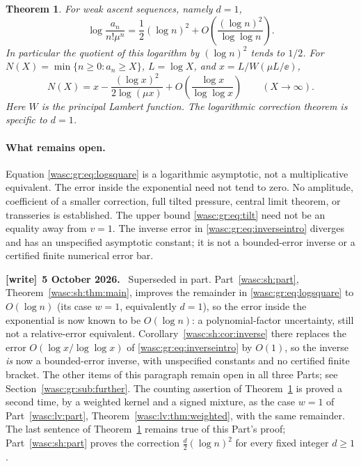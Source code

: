 \documentclass[11pt,a4paper]{article}
\newtheorem{theorem}{Theorem}[section]
\theoremstyle{remark}\newtheorem{remark}[theorem]{Remark}
\numberwithin{equation}{section}
\newenvironment{writenote}[1][]{\par\smallskip\begingroup\small
 \noindent\textbf{[write]}\if\relax\detokenize{#1}\relax\else~\textbf{#1.}\fi\ }%
 {\par\endgroup\smallskip}
\begin{document}
\begin{theorem}\label{wasc:gr:thm:logsquare}
For weak ascent sequences, namely $d=1$,
\begin{equation}\label{wasc:gr:eq:logsquare}
\log\frac{a_n}{n!\mu^n}=\frac12(\log n)^2+
O\!\left(\frac{(\log n)^2}{\log\log n}\right).
\end{equation}
In particular the quotient of this logarithm by $(\log n)^2$ tends to $1/2$.
For $N(X)=\min\{n\ge0:a_n\ge X\}$, $L=\log X$, and
$x=L/W(\mu L/\ee)$,
\begin{equation}\label{wasc:gr:eq:inverseintro}
N(X)=x-\frac{(\log x)^2}{2\log(\mu x)}
+O\!\left(\frac{\log x}{\log\log x}\right)\qquad(X\to\infty).
\end{equation}
Here $W$ is the principal Lambert function. The logarithmic correction theorem is specific to $d=1$.
\end{theorem}

\paragraph{What remains open.}
Equation \eqref{wasc:gr:eq:logsquare} is a logarithmic asymptotic, not a multiplicative equivalent. The error inside the exponential need not tend to zero. No amplitude, coefficient of a smaller correction, full tilted pressure, central limit theorem, or transseries is established. The upper bound \eqref{wasc:gr:eq:tilt} need not be an equality away from $v=1$. The inverse error in \eqref{wasc:gr:eq:inverseintro} diverges and has an unspecified asymptotic constant; it is not a bounded-error inverse or a certified finite numerical error bar.
\begin{writenote}[5 October 2026]
Superseded in part. Part~\ref{wasc:sh:part}, Theorem~\ref{wasc:sh:thm:main}, improves the remainder in \eqref{wasc:gr:eq:logsquare} to $O(\log n)$ (its case $w=1$, equivalently $d=1$), so the error inside the exponential is now known to be $O(\log n)$: a polynomial-factor uncertainty, still not a relative-error equivalent. Corollary~\ref{wasc:sh:cor:inverse} there replaces the error $O(\log x/\log\log x)$ of \eqref{wasc:gr:eq:inverseintro} by $O(1)$, so the inverse \emph{is} now a bounded-error inverse, with unspecified constants and no certified finite bracket. The other items of this paragraph remain open in all three Parts; see Section~\ref{wasc:gr:sub:further}. The counting assertion of Theorem~\ref{wasc:gr:thm:logsquare} is proved a second time, by a weighted kernel and a signed mixture, as the case $w=1$ of Part~\ref{wasc:lv:part}, Theorem~\ref{wasc:lv:thm:weighted}, with the same remainder. The last sentence of Theorem~\ref{wasc:gr:thm:logsquare} remains true of this Part's proof; Part~\ref{wasc:sh:part} proves the correction $\frac d2(\log n)^2$ for every fixed integer $d\ge1$.
\end{writenote}
\end{document}
